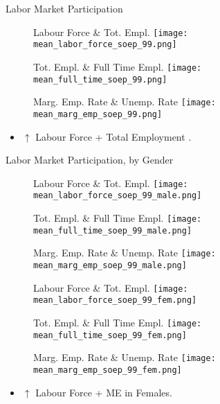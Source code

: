 \documentclass[hyperref={bookmarks=false}]{beamer}
\let\oldcite=\cite
\renewcommand{\cite}[1]{\textcolor[rgb]{.0,.2,.7}{\oldcite{#1}}}
\begin{document}
\begin{appendix}
\begin{frame}{Labor Market Participation}
\begin{figure}[!t]
\centering
\begin{minipage}[b]{0.32\textwidth}{Labour Force \&  Tot. Empl.}
\centering
\texttt{[image: mean\_labor\_force\_soep\_99.png]}
\end{minipage}
\begin{minipage}[b]{0.32\textwidth}{Tot. Empl. \& Full Time Empl.}
\centering
\texttt{[image: mean\_full\_time\_soep\_99.png]}
\end{minipage}
\begin{minipage}[b]{0.32\textwidth}{Marg. Emp. Rate \& Unemp. Rate}
\centering
\texttt{[image: mean\_marg\_emp\_soep\_99.png]}
\end{minipage}
\end{figure}
\begin{itemize}
\setlength{\itemsep}{0.7 cm}
\item $\uparrow$ Labour Force + Total Employment \cite{CarriTuRo15}.
\end{itemize}
\end{frame}

\begin{frame}{Labor Market Participation, by Gender}
\begin{figure}[!t]
\centering
\begin{minipage}[b]{0.32\textwidth}{Labour Force \&  Tot. Empl.}
\centering
\texttt{[image: mean\_labor\_force\_soep\_99\_male.png]}
\end{minipage}
\begin{minipage}[b]{0.32\textwidth}{Tot. Empl. \& Full Time Empl.}
\centering
\texttt{[image: mean\_full\_time\_soep\_99\_male.png]}
\end{minipage}
\begin{minipage}[b]{0.32\textwidth}{Marg. Emp. Rate \& Unemp. Rate}
\centering
\texttt{[image: mean\_marg\_emp\_soep\_99\_male.png]}
\end{minipage}
\begin{minipage}[b]{0.32\textwidth}{Labour Force \&  Tot. Empl.}
\centering
\texttt{[image: mean\_labor\_force\_soep\_99\_fem.png]}
\end{minipage}
\begin{minipage}[b]{0.32\textwidth}{Tot. Empl. \& Full Time Empl.}
\centering
\texttt{[image: mean\_full\_time\_soep\_99\_fem.png]}
\end{minipage}
\begin{minipage}[b]{0.32\textwidth}{Marg. Emp. Rate \& Unemp. Rate}
\centering
\texttt{[image: mean\_marg\_emp\_soep\_99\_fem.png]}
\end{minipage}
\end{figure}
\begin{itemize}
\setlength{\itemsep}{0.7 cm}
\item $\uparrow$ Labour Force + ME in Females.
\end{itemize}
\hyperlink{DATA5}{}
\end{frame}



\end{appendix}
\end{document}
